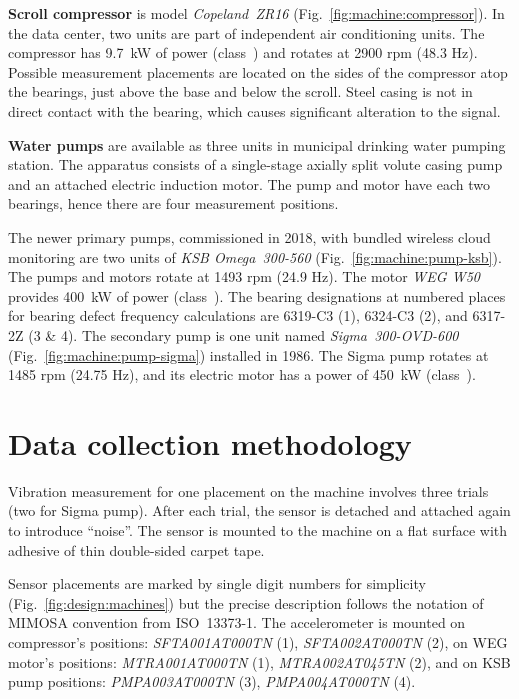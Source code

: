 \textbf{Scroll compressor} is model \emph{Copeland~ZR16} (Fig.~\ref{fig:machine:compressor}). In the data center,  two units are part of independent air conditioning units. The compressor has 9.7~kW of power (class~) and rotates at 2900 rpm (48.3 Hz). Possible measurement placements are located on the sides of the compressor atop the bearings, just above the base and below the scroll. Steel casing is not in direct contact with the bearing, which causes significant alteration to the signal.

\textbf{Water pumps} are available as three units in municipal drinking water pumping station. The apparatus consists of a single-stage axially split volute casing pump and an attached electric induction motor. The pump and motor have each two bearings, hence there are four measurement positions.

The newer primary pumps, commissioned in 2018, with bundled wireless cloud monitoring are two units of \emph{KSB Omega~300-560} (Fig.~\ref{fig:machine:pump-ksb}). The pumps and motors rotate at 1493 rpm (24.9 Hz). The motor \emph{WEG W50} provides 400~kW of power (class~). The bearing designations at numbered places for bearing defect frequency calculations are 6319-C3 (1), 6324-C3 (2), and 6317-2Z (3 \& 4). The secondary pump is one unit named \emph{Sigma~300-OVD-600} (Fig.~\ref{fig:machine:pump-sigma}) installed in 1986. The Sigma pump rotates at 1485 rpm (24.75 Hz), and its electric motor has a power of 450~kW (class~). 

\section{Data collection methodology}
Vibration measurement for one placement on the machine involves three trials (two for Sigma pump). After each trial, the sensor is detached and attached again to introduce ``noise''. The sensor is mounted to the machine on a flat surface with adhesive of thin double-sided carpet tape.

Sensor placements are marked by single digit numbers for simplicity (Fig.~\ref{fig:design:machines}) but the precise description follows the notation of MIMOSA convention from ISO~13373-1. The accelerometer is mounted on compressor's positions: \emph{SFTA001AT000TN} (1), \emph{SFTA002AT000TN} (2), on WEG motor's positions: \emph{MTRA001AT000TN} (1), \emph{MTRA002AT045TN} (2), and on KSB pump positions: \emph{PMPA003AT000TN} (3), \emph{PMPA004AT000TN} (4).

